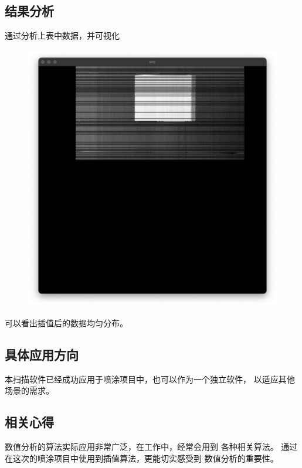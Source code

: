 \documentclass{article}
\begin{document}
\subsection{结果分析}
通过分析上表中数据，并可视化
\begin{figure}[H]
    \centering
    \includegraphics[width=.5\textwidth]{相关资源/图片/题目5扫描结果分析.png} 
\end{figure}
可以看出插值后的数据均匀分布。

\subsection{具体应用方向}
本扫描软件已经成功应用于喷涂项目中，也可以作为一个独立软件，
以适应其他场景的需求。

\subsection{相关心得}
数值分析的算法实际应用非常广泛，在工作中，经常会用到
各种相关算法。
通过在这次的喷涂项目中使用到插值算法，更能切实感受到
数值分析的重要性。
\end{document}
